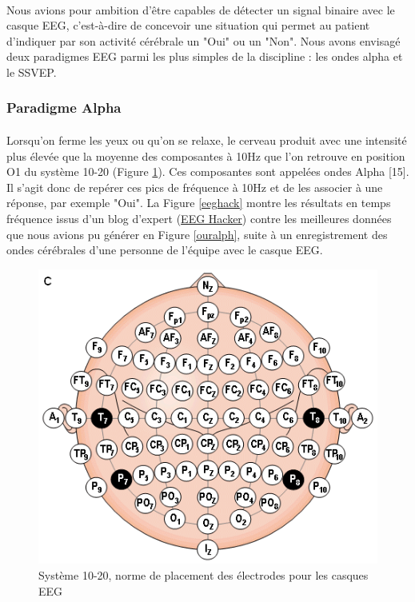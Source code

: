 \documentclass[11pt,a4paper]{article}
\theoremstyle{plain}
\theoremstyle{definition}
\begin{document}
\paragraph{} Nous avions pour ambition d'être capables de détecter un signal binaire avec le casque EEG, c'est-à-dire de concevoir une situation qui permet au patient
d'indiquer par son activité cérébrale un "Oui" ou un "Non". Nous avons envisagé deux paradigmes EEG parmi les plus simples de la discipline : les ondes alpha et 
le SSVEP. 

\subsubsection{Paradigme Alpha}


\paragraph{} Lorsqu'on ferme les yeux ou qu'on se relaxe, le cerveau produit avec une intensité plus élevée que la moyenne des composantes à 10Hz que l'on retrouve en position O1 du système 10-20 (Figure \ref{dix}).
Ces composantes sont appelées ondes Alpha [15]. Il s'agit donc de repérer ces pics de fréquence à 10Hz et de les associer à une réponse, par
exemple "Oui". La Figure \ref{eeghack} montre les résultats en temps fréquence issus d'un blog d'expert (\href{http://eeghacker.blogspot.com/}{EEG Hacker}) contre les meilleures données que nous avions pu générer en Figure \ref{ouralph}, suite à un enregistrement des ondes cérébrales d'une personne de l'équipe avec le casque EEG.

\begin{figure}[h!]
\centering
\includegraphics[scale=0.4]{images/1020.png}
\caption{Système 10-20, norme de placement des électrodes pour les casques EEG}
\label{dix}
\end{figure}
\end{document}
